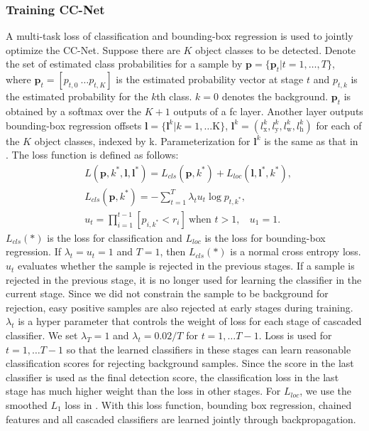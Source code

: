 \documentclass[10pt,twocolumn,letterpaper]{article}
\begin{document}
\subsubsection{Training CC-Net}
A multi-task loss of classification and bounding-box regression is used to jointly optimize the CC-Net. Suppose there are $K$ object classes to be detected. Denote the set of estimated class probabilities for a sample  by $\mathbf{p}=\{\mathbf{p}_t| t= 1, \ldots, T\}$, where $\mathbf{p}_t=[p_{t, 0}\ \ldots p_{t, K} ]$ is the estimated probability vector at stage $t$ and $p_{t, k}$ is the estimated probability for the $k$th class. $k=0$ denotes the background. $\mathbf{p}_t$ is obtained by a softmax over the $K+1$ outputs of a fc layer. Another layer outputs bounding-box regression offsets $\mathbf{l} =\{\mathbf{l}^{k}|k=1, \ldots $K$ \}$, $\mathbf{l}^k=(l^k_\textrm{x}, l^k_\textrm{y}, l^k_\textrm{w}, l^k_\textrm{h})$  for each of the $K$ object classes, indexed by k. Parameterization for $\mathbf{l}^k$ is the same as that in \cite{girshick2014rich}.
The loss function is defined as follows:
\begin{align}
&L(\mathbf{p}, k^*, \mathbf{l} , \mathbf{l} ^*) = L_{cls}(\mathbf{p}, k^*)+L_{loc}(\mathbf{l}, \mathbf{l}^*, k^*), \\
& L_{cls}(\mathbf{p}, k^*)=-\sum_{t=1}^T \lambda_t u_t \log p_{t,k^*}, \\
&u_t = \prod_{i=1}^{t-1} [p_{i,k^*}<r_i] \ \textrm{when } t>1,  \ \ \ \ u_1 = 1.
 \label{eq:loss}
\end{align}
$L_{cls}(*)$ is the loss for classification and $L_{loc}$ is the loss for bounding-box regression. If $\lambda_t = u_t=1$ and $T=1$, then $L_{cls}(*)$  is a normal cross entropy loss.
$u_t$ evaluates whether the sample is rejected in the previous stages. If a sample is rejected in the previous stage, it is no longer used for learning the classifier in the current stage. Since we did not constrain the sample to be background for rejection, easy positive samples are also rejected at early stages during training. $\lambda_t$ is a hyper parameter that controls the weight of loss for each stage of cascaded classifier. We set $\lambda_T=1$ and $\lambda_t=0.02/T$ for $t=1, \ldots T-1$. Loss is used for $t=1, \ldots T-1$ so that the learned classifiers in these stages can learn reasonable classification scores for rejecting background samples.  Since the score in the last classifier is used as the final detection score, the classification loss in the last stage has much higher weight than the loss in other stages. For $L_{loc}$, we use the  smoothed $L_1$ loss in \cite{girshick2015fast}. With this loss function, bounding box regression, chained features and all cascaded classifiers are learned jointly through backpropagation.
\end{document}

